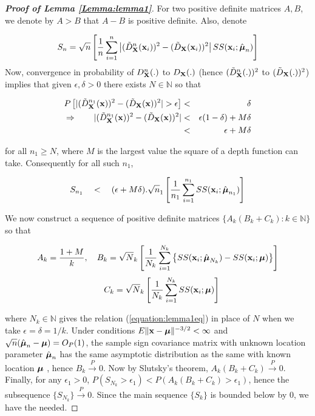 \documentclass[fleqn,11pt]{article}
\begin{document}
\begin{proof}[\textbf{Proof of Lemma \ref{Lemma:lemma1}}]
For two positive definite matrices $A,B$, we denote by $A>B$ that $A-B$ is positive definite. Also, denote

$$ S_n = \sqrt n \left[ \frac{1}{n} \sum_{i=1}^n \left| (\tilde D^{n} _{\mathbf{X}} ({\bf{x}}_i))^2  - (\tilde D_{\mathbf{X}} ({\bf{x}}_i))^2 \right| SS({\bf{x}}_i; \hat{{\boldsymbol{\mu}}}_n) \right] $$
Now, convergence in probability of $D^n_{\mathbf{X}}(.)$ to $D_{\mathbf{X}}(.)$ (hence $(\tilde D^n_{\mathbf{X}}(.))^2$ to $(\tilde D_{\mathbf{X}}(.))^2$) implies that given $\epsilon, \delta > 0$ there exists $N \in \mathbb{N}$ so that

\begin{eqnarray} \label{equation:lemma1eq}
\notag P \left[ |(\tilde D^{n_1}_{\mathbf{X}}({\bf{x}}))^2 - (\tilde D_{\mathbf{X}}({\bf{x}}))^2| > \epsilon \right] &<& \delta\\
\notag \Rightarrow \qquad |(\tilde D^{n_1}_{\mathbf{X}}({\bf{x}}))^2 - (\tilde D_{\mathbf{X}}({\bf{x}}))^2|
&<& \epsilon(1-\delta) + M\delta \\
&<& \epsilon + M\delta
\end{eqnarray}

for all $n_1 \geq N$, where $M$ is the largest value the square of a depth function can take. Consequently for all such $n_1$,

$$ S_{n_1} \quad < \quad
(\epsilon + M\delta) . \sqrt n_1 \left[ \frac{1}{n_1} \sum_{i=1}^{n_1} SS({\bf{x}}_i; \hat{{\boldsymbol{\mu}}}_{n_1}) \right] $$

We now construct a sequence of positive definite matrices $\{A_k (B_k+C_k) : k \in \mathbb N\} $ so that

$$ A_k = \frac{1+M}{k}, \quad B_k = \sqrt N_k \left[ \frac{1}{N_k} \sum_{i=1}^{N_k} \left\{ SS({\bf{x}}_i; \hat{{\boldsymbol{\mu}}}_{N_k}) - SS({\bf{x}}_i; {\boldsymbol{\mu}}) \right\} \right] $$
$$ \quad C_k = \sqrt N_k \left[ \frac{1}{N_k} \sum_{i=1}^{N_k} SS({\bf{x}}_i; {\boldsymbol{\mu}}) \right] $$

where $N_k \in \mathbb N$ gives the relation (\ref{equation:lemma1eq}) in place of $N$ when we take $\epsilon = \delta  =1/k$. Under conditions $ E\|{\bf{x}} - {\boldsymbol{\mu}}\|^{-3/2} < \infty $ and $\sqrt n (\hat{{\boldsymbol{\mu}}}_n - {\boldsymbol{\mu}}) = O_P(1)$, the sample sign covariance matrix with unknown location parameter $\hat{{\boldsymbol{\mu}}}_n$ has the same asymptotic distribution as the same with known location ${\boldsymbol{\mu}}$ \citep{durre14}, hence $B_k \stackrel{P}{\rightarrow} 0$. Now by Slutsky's theorem, $A_k (B_k+C_k) \stackrel{P}{\rightarrow} 0$. Finally, for any $\epsilon_1 > 0$, $ P(S_{N_k} > \epsilon_1) < P(A_k (B_k + C_k) > \epsilon_1)$, hence the subsequence $\{S_{N_k}\} \stackrel{P}{\rightarrow} 0$. Since the main sequence $\{S_k\}$ is bounded below by 0, we have the needed.
\end{proof}
\end{document}
